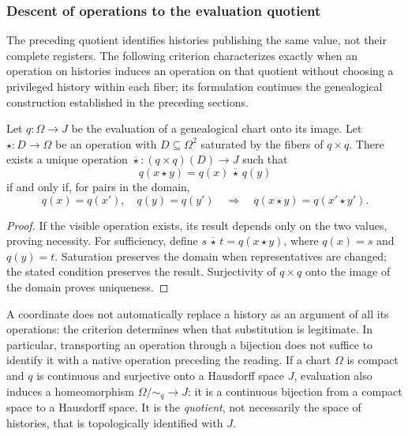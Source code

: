 \subsubsection{Descent of operations to the evaluation quotient}
\label{sec:ch-descenso-fibras}

The preceding quotient identifies histories publishing the same value, not
their complete registers. The following criterion characterizes exactly
when an operation on histories induces an operation on that quotient without
choosing a privileged history within each fiber; its formulation
continues the genealogical construction established in the preceding sections.

\begin{proposition}
\label{prop:ch-descenso-fibras}
Let \(q:\Omega\to J\) be the evaluation of a genealogical
chart onto its image. Let \(\star:D\to\Omega\) be an operation with
\(D\subseteq\Omega^2\) saturated by the fibers of \(q\times q\).
There exists a unique operation
\(\overline\star:(q\times q)(D)\to J\) such that
\[
 q(x\star y)=q(x)\,\overline\star\,q(y)
\]
if and only if, for pairs in the domain,
\[
 q(x)=q(x'),\quad q(y)=q(y')
 \quad\Longrightarrow\quad q(x\star y)=q(x'\star y').
\]
\end{proposition}

\begin{proof}
If the visible operation exists, its result depends only on the two
values, proving necessity. For sufficiency, define
\(s\,\overline\star\,t=q(x\star y)\), where \(q(x)=s\) and
\(q(y)=t\). Saturation preserves the domain when representatives are changed;
the stated condition preserves the result. Surjectivity of
\(q\times q\) onto the image of the domain proves uniqueness.
\end{proof}

A coordinate does not automatically replace a history as an argument of
all its operations: the criterion determines when that substitution is
legitimate. In particular, transporting an operation through a bijection
does not suffice to identify it with a native operation preceding the reading.
If a chart \(\Omega\) is compact and \(q\) is continuous and surjective
onto a Hausdorff space \(J\), evaluation also induces a
homeomorphism \(\Omega/{\sim_q}\to J\): it is a continuous bijection from a
compact space to a Hausdorff space. It is the \emph{quotient}, not necessarily the
space of histories, that is topologically identified with \(J\).
